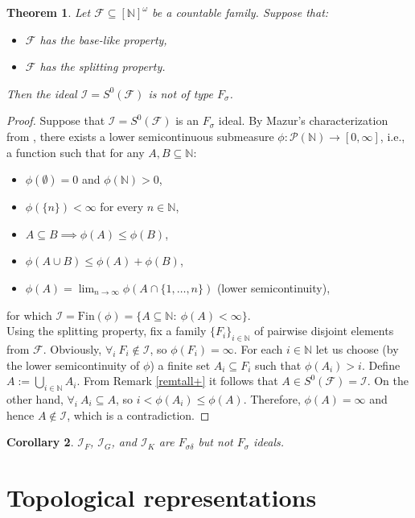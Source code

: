 \documentclass{amsart}
\newtheorem{thm}{Theorem}[section]
\newtheorem{cor}[thm]{Corollary}
\theoremstyle{definition}
\newcommand{\N}{{\mathbb N}}
\newcommand{\Fin}{\textrm{Fin}}
\newcommand{\I}{\mathcal I}
\newcommand{\InfSubs}{[\N]^{\omega}}
\newcommand{\MB}{S^0}
\begin{document}
\begin{thm} \label{thmFsigma}
Let $\mathcal{F}\subseteq \InfSubs$ be a countable family. Suppose that: 
\begin{itemize}
	\item[$(i)$] $\mathcal{F}$ has the base-like property,
	\item[$(ii)$] $\mathcal{F}$ has the splitting property.
\end{itemize} 
Then the ideal $\I=\MB(\mathcal{F})$ is not of type $F_{\sigma}$.
\end{thm}

\begin{proof}
Suppose that $\I=\MB(\mathcal{F})$ is an $F_\sigma$ ideal.
By Mazur's characterization from \cite{Maz}, there exists a lower semicontinuous submeasure $\phi\colon\mathcal{P}(\N)\to [0, \infty]$, i.e., a function such that for any $A,B\subseteq\N$:
\begin{itemize}
\item $\phi(\emptyset)=0$ and $\phi(\N)>0$,
\item $\phi(\{n\})<\infty$ for every $n\in\N$,
\item $A\subseteq B \implies\phi(A)\leq \phi(B)$,
\item $\phi(A\cup B) \leq \phi(A) + \phi(B)$,
\item \label{continuity-condition} $\phi(A)=\lim_{n\to\infty} \phi(A \cap \{1,\ldots,n\})$ (lower semicontinuity),
\end{itemize}
for which $\I= \Fin(\phi)=\{A\subseteq \N :\ \phi(A)<\infty\}$.\\
Using the splitting property, fix a family $\{F_i\}_{i\in\N}$ of pairwise disjoint elements from $\mathcal{F}$.
Obviously, $\forall_{i}\ F_i\notin\I$, so $\phi(F_i)=\infty$. For each $i\in\N$ let us choose (by the lower semicontinuity of $\phi$) a finite set $A_i\subseteq F_i$ such that $\phi(A_i)>i$. Define $A:=\bigcup_{i\in\N}{A_i}$. From Remark \ref{remtall+} it follows that $A\in S^0(\mathcal{F}) = \I$. On the other hand, $\forall_{i}\ A_i \subseteq A$, so $i<\phi(A_i)\leq \phi(A)$. Therefore, $\phi(A)=\infty$ and hence $A\notin\I$, which is a contradiction.
\end{proof}

\begin{cor}
$\I_F$, $\I_G$, and $\I_K$ are $F_{\sigma\delta}$ but not $F_{\sigma}$ ideals.
\end{cor}


\section{Topological representations}
\end{document}
